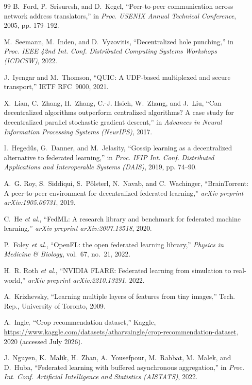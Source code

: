 \documentclass[a4paper,fleqn]{cas-dc}
\begin{document}
\begin{thebibliography}{99}
B.~Ford, P.~Srisuresh, and D.~Kegel,
``Peer-to-peer communication across network address translators,''
in \emph{Proc. USENIX Annual Technical Conference}, 2005, pp. 179--192.

M.~Seemann, M.~Inden, and D.~Vyzovitis,
``Decentralized hole punching,''
in \emph{Proc. IEEE 42nd Int. Conf. Distributed Computing Systems Workshops (ICDCSW)}, 2022.

J.~Iyengar and M.~Thomson,
``QUIC: A UDP-based multiplexed and secure transport,''
IETF RFC~9000, 2021.

X.~Lian, C.~Zhang, H.~Zhang, C.-J. Hsieh, W.~Zhang, and J.~Liu,
``Can decentralized algorithms outperform centralized algorithms? A case study for decentralized parallel stochastic gradient descent,''
in \emph{Advances in Neural Information Processing Systems (NeurIPS)}, 2017.

I.~Heged\H{u}s, G.~Danner, and M.~Jelasity,
``Gossip learning as a decentralized alternative to federated learning,''
in \emph{Proc. IFIP Int. Conf. Distributed Applications and Interoperable Systems (DAIS)}, 2019, pp. 74--90.

A.~G. Roy, S.~Siddiqui, S.~P\"olsterl, N.~Navab, and C.~Wachinger,
``BrainTorrent: A peer-to-peer environment for decentralized federated learning,''
\emph{arXiv preprint arXiv:1905.06731}, 2019.

C.~He \emph{et al.},
``FedML: A research library and benchmark for federated machine learning,''
\emph{arXiv preprint arXiv:2007.13518}, 2020.

P.~Foley \emph{et al.},
``OpenFL: the open federated learning library,''
\emph{Physics in Medicine \& Biology}, vol.~67, no.~21, 2022.

H.~R. Roth \emph{et al.},
``NVIDIA FLARE: Federated learning from simulation to real-world,''
\emph{arXiv preprint arXiv:2210.13291}, 2022.

A.~Krizhevsky,
``Learning multiple layers of features from tiny images,''
Tech. Rep., University of Toronto, 2009.

A.~Ingle,
``Crop recommendation dataset,''
Kaggle, \url{https://www.kaggle.com/datasets/atharvaingle/crop-recommendation-dataset}, 2020 (accessed July 2026).

J.~Nguyen, K.~Malik, H.~Zhan, A.~Yousefpour, M.~Rabbat, M.~Malek, and D.~Huba,
``Federated learning with buffered asynchronous aggregation,''
in \emph{Proc. Int. Conf. Artificial Intelligence and Statistics (AISTATS)}, 2022.


\end{thebibliography}
\end{document}
